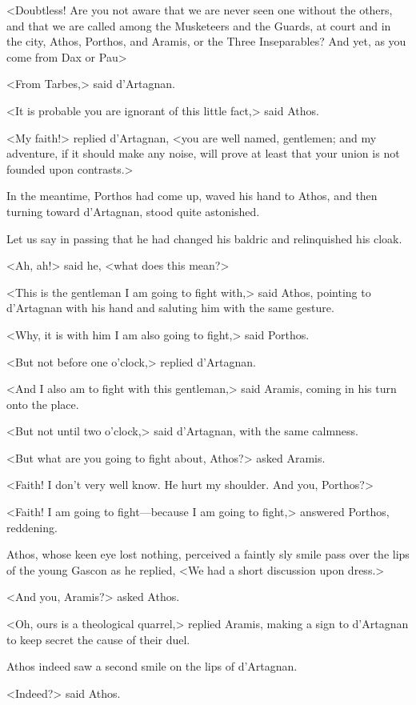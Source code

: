 <Doubtless! Are you not aware that we are never seen one without the others, and that we are called among the Musketeers and the Guards, at court and in the city, Athos, Porthos, and Aramis, or the Three Inseparables? And yet, as you come from Dax or Pau\longdash> 

<From Tarbes,> said d'Artagnan. 

<It is probable you are ignorant of this little fact,> said Athos. 

<My faith!> replied d'Artagnan, <you are well named, gentlemen; and my adventure, if it should make any noise, will prove at least that your union is not founded upon contrasts.> 

In the meantime, Porthos had come up, waved his hand to Athos, and then turning toward d'Artagnan, stood quite astonished. 

Let us say in passing that he had changed his baldric and relinquished his cloak. 

<Ah, ah!> said he, <what does this mean?> 

<This is the gentleman I am going to fight with,> said Athos, pointing to d'Artagnan with his hand and saluting him with the same gesture. 

<Why, it is with him I am also going to fight,> said Porthos. 

<But not before one o'clock,> replied d'Artagnan. 

<And I also am to fight with this gentleman,> said Aramis, coming in his turn onto the place. 

<But not until two o'clock,> said d'Artagnan, with the same calmness. 

<But what are you going to fight about, Athos?> asked Aramis. 

<Faith! I don't very well know. He hurt my shoulder. And you, Porthos?> 

<Faith! I am going to fight---because I am going to fight,> answered Porthos, reddening. 

Athos, whose keen eye lost nothing, perceived a faintly sly smile pass over the lips of the young Gascon as he replied, <We had a short discussion upon dress.> 

<And you, Aramis?> asked Athos. 

<Oh, ours is a theological quarrel,> replied Aramis, making a sign to d'Artagnan to keep secret the cause of their duel. 

Athos indeed saw a second smile on the lips of d'Artagnan. 

<Indeed?> said Athos. 

